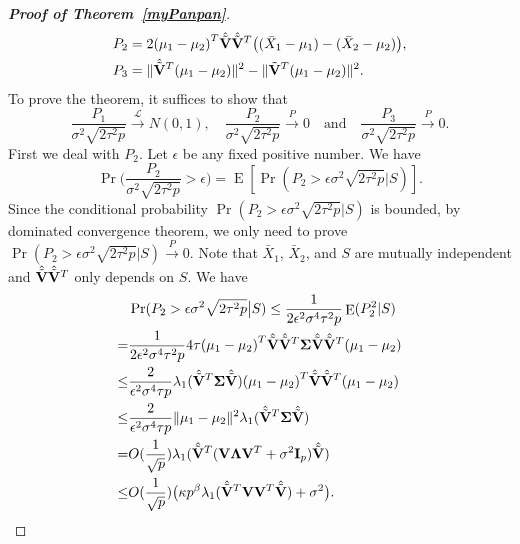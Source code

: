 \documentclass[review]{elsarticle}
\DeclareMathOperator{\myE}{E}
\theoremstyle{plain}
\theoremstyle{definition}
\theoremstyle{remark}
\begin{document}
\begin{proof}[\textbf{Proof of Theorem~\ref{myPanpan}}]
\begin{align*}
    P_2&=2{(\mu_1-\mu_2)}^T \hat{\tilde{\mathbf{V}}}\hat{\tilde{\mathbf{V}}}^T\big((\bar{X}_1-\mu_1)-(\bar{X}_2-\mu_2)\big),\\
    P_3&=\|\hat{\tilde{\mathbf{V}}}^T(\mu_1-\mu_2)\|^2-\|\tilde{\mathbf{V}}^T(\mu_1-\mu_2)\|^2.
\end{align*}
To prove the theorem, it suffices to show that
$$
    \frac{P_1}{\sigma^2\sqrt{2\tau^2 p}}\xrightarrow{\mathcal{L}} N(0,1),
    \quad
    \frac{P_2}{\sigma^2\sqrt{2\tau^2 p}}\xrightarrow{P} 0
    \quad
    \textrm{and}
    \quad
    \frac{P_3}{\sigma^2\sqrt{2\tau^2 p}}\xrightarrow{P}0.
    $$
   First we deal with $P_2$.
   Let $\epsilon$ be any fixed positive number. 
   We have
   $$
   \Pr\Big(\frac{P_2}{\sigma^2\sqrt{2\tau^2 p}}>\epsilon\Big)
   =
   \myE[\Pr({P_2}>\epsilon{\sigma^2\sqrt{2\tau^2 p}}\big|S)].
   $$
   Since the conditional probability 
   $
   \Pr({P_2}>\epsilon{\sigma^2\sqrt{2\tau^2 p}}\big|S)
   $
   is bounded, by dominated convergence theorem, we only need to prove
   $\Pr({P_2}>\epsilon{\sigma^2\sqrt{2\tau^2 p}}\big|S)\xrightarrow{P}0$.
    Note that $\bar{X}_1$, $\bar{X}_2$, and $S$ are mutually independent and $\hat{\tilde{\mathbf{V}}}\hat{\tilde{\mathbf{V}}}^T$ only depends on $S$.
    We have
    \begin{equation*}
        \begin{aligned}
            &\Pr({P_2}>\epsilon{\sigma^2\sqrt{2\tau^2 p}}\big|S)\leq
            \frac{1}{2\epsilon^2\sigma^4\tau^2 p}\myE (P_2^2|S)\\
            =&\frac{1}{2\epsilon^2\sigma^4\tau^2 p} 4\tau {(\mu_1-\mu_2)}^T \hat{\tilde{\BV}}\hat{\tilde{\BV}}^T\bSigma \hat{\tilde{\BV}}\hat{\tilde{\BV}}^T(\mu_1-\mu_2)\\
            \leq &
            \frac{2}{\epsilon^2\sigma^4\tau p}
             \lambda_1(\hat{\tilde{\BV}}^T\bSigma \hat{\tilde{\BV}}) {(\mu_1-\mu_2)}^T \hat{\tilde{\BV}}\hat{\tilde{\BV}}^T(\mu_1-\mu_2)\\
            \leq & 
\frac{2}{\epsilon^2\sigma^4\tau p}
             \|\mu_1-\mu_2\|^2
             \lambda_1(\hat{\tilde{\BV}}^T\bSigma \hat{\tilde{\BV}})\\
             =&
             O(\frac{1}{\sqrt{p}})
             \lambda_1(\hat{\tilde{\BV}}^T (\BV\bLambda \BV^T +\sigma^2 \BI_p) \hat{\tilde{\BV}})\\
             \leq &
             O(\frac{1}{\sqrt{p}})
             \big(\kappa p^{\beta}\lambda_1(\hat{\tilde{\BV}}^T \BV\BV^T  \hat{\tilde{\BV}})+\sigma^2\big).\\
        \end{aligned}

\end{equation*}
\end{proof}
\end{document}
